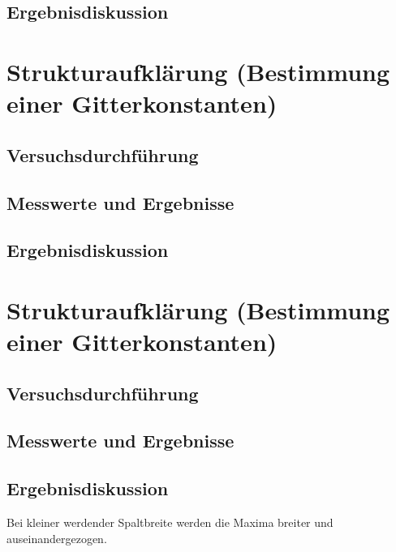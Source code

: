 \documentclass{scrartcl}
\begin{document}
\subsection{Ergebnisdiskussion}

\section{Strukturaufklärung (Bestimmung einer Gitterkonstanten)}
\subsection{Versuchsdurchführung}
\subsection{Messwerte und Ergebnisse}
\subsection{Ergebnisdiskussion}

\section{Strukturaufklärung (Bestimmung einer Gitterkonstanten)}
\subsection{Versuchsdurchführung}
\subsection{Messwerte und Ergebnisse}
\subsection{Ergebnisdiskussion}
Bei kleiner werdender Spaltbreite werden die Maxima breiter und auseinandergezogen.
\end{document}
